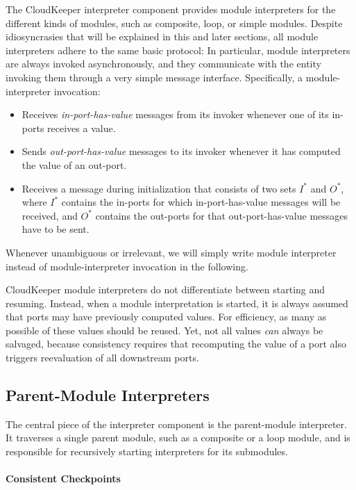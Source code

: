 \documentclass[paper=letter,fontsize=11pt,captions=tableheading]{scrartcl}
\numberwithin{equation}{section}
\theoremstyle{algorithm}
\theoremstyle{plain}
\theoremstyle{nonumberplain}
\begin{document}
The CloudKeeper interpreter component provides module interpreters for the different kinds of modules, such as composite, loop, or simple modules. Despite idiosyncrasies that will be explained in this and later sections, all module interpreters adhere to the same basic protocol: In particular, module interpreters are always invoked asynchronously, and they communicate with the entity invoking them through a very simple message interface. Specifically, a module-interpreter invocation:
%
\begin{itemize}
	\item Receives \emph{in-port-has-value} messages from its invoker whenever one of its in-ports receives a value.
	\item Sends \emph{out-port-has-value} messages to its invoker whenever it has computed the value of an out-port.
	\item Receives a message during initialization that consists of two sets $I^*$ and $O^*$, where $I^*$ contains the in-ports for which in-port-has-value messages will be received, and $O^*$ contains the out-ports for that out-port-has-value messages have to be sent.
\end{itemize}
%
Whenever unambiguous or irrelevant, we will simply write module interpreter instead of module-interpreter invocation in the following.

CloudKeeper module interpreters do not differentiate between starting and resuming. Instead, when a module interpretation is started, it is always assumed that ports may have previously computed values. For efficiency, as many as possible of these values should be reused. Yet, not all values \emph{can} always be salvaged, because consistency requires that recomputing the value of a port also triggers reevaluation of all downstream ports.


\subsection{Parent-Module Interpreters} \label{sec:parentinterpreter}

The central piece of the interpreter component is the parent-module interpreter. It traverses a single parent module, such as a composite or a loop module, and is responsible for recursively starting interpreters for its submodules.

\paragraph{Consistent Checkpoints}
\end{document}
